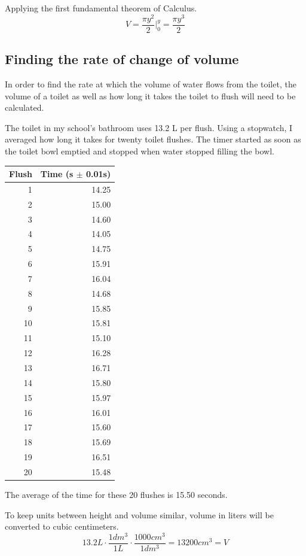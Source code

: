 \documentclass[12pt, titlepage]{article}
\begin{document}
Applying the first fundamental theorem of Calculus.
\begin{equation*}
    V = \frac{ \pi y^2 }{2} \biggr \rvert^y_0 = \frac{\pi y^3}{2}
\end{equation*}

\subsection{Finding the rate of change of volume}
In order to find the rate at which the volume of water flows from the toilet, the volume of a toilet as well as how long it takes the toilet to flush will need to be calculated. 

\pagebreak
The toilet in my school's bathroom uses 13.2 L per flush. Using a stopwatch, I averaged how long it takes for twenty toilet flushes. The timer started as soon as the toilet bowl emptied and stopped when water stopped filling the bowl.

\begin{center}
\begin{tabular}{rr}
Flush & Time (s \(\pm\) 0.01s)\\
\hline
1 & 14.25\\
2 & 15.00\\
3 & 14.60\\
4 & 14.05\\
5 & 14.75\\
6 & 15.91\\
7 & 16.04\\
8 & 14.68\\
9 & 15.85\\
10 & 15.81\\
11 & 15.10\\
12 & 16.28\\
13 & 16.71\\
14 & 15.80\\
15 & 15.97\\
16 & 16.01\\
17 & 15.60\\
18 & 15.69\\
19 & 16.51\\
20 & 15.48\\
\end{tabular}
\end{center}

The average of the time for these 20 flushes is 15.50 seconds. 

To keep units between height and volume similar, volume in liters will be converted to cubic centimeters.
\begin{equation*}
  13.2 L \cdot \frac{1 dm^{3}}{1 L} \cdot \frac{1000 cm^{3}}{1 dm^{3}} = 13200 cm^{3} = V
\end{equation*}
\end{document}
